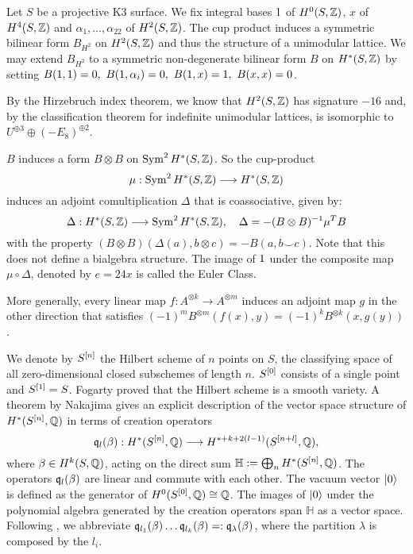 \begin{definition}
Let $S$ be a projective K3 surface. We fix integral bases $1$ of $H^0(S,\mathbb{Z})$, $x$ of $H^4(S,\mathbb{Z})$ and $\alpha_1,\ldots ,\alpha_{22}$ of $H^2(S,\mathbb{Z})$. The cup product induces a symmetric bilinear form $B_{H^2}$ on $H^2(S,\mathbb{Z})$ and thus the structure of a unimodular lattice.
We may extend $B_{H^2}$ to a symmetric non-degenerate bilinear form $B$ on $H^\ast(S,\mathbb{Z})$ by setting $ B(1,1) = 0,\ B(1,\alpha_i) = 0,\ B(1,x) = 1, \ B(x,x) = 0$.
\end{definition}
By the Hirzebruch index theorem, we know that $H^2(S,\mathbb{Z})$ has signature $-16$ and, by the classification theorem for indefinite unimodular lattices, is isomorphic to $U^{\oplus 3}\oplus (-E_8)^{\oplus 2}$.
\begin{definition}\label{comult}
$B$ induces a form $B\otimes B$ on $\operatorname{Sym}^2H^\ast(S,\mathbb{Z})$. So the cup-product 
\begin{equation*}
\mu : \operatorname{Sym} ^2H^{*}(S,\mathbb{Z}) \longrightarrow H^\ast(S,\mathbb{Z}) 
\end{equation*}
induces an adjoint comultiplication $\Delta$ that is coassociative, given by:
\begin{equation*}
\Delta : H^\ast(S,\mathbb{Z}) \longrightarrow \operatorname{Sym}^2H^\ast(S,\mathbb{Z}),\quad \Delta = -(B\otimes B)^{-1}\mu^TB
\end{equation*}
with the property $(B\otimes B)\left(\Delta(a),b\otimes c\right)=-B\left(a,b\smile c\right)$. Note that this does not define a bialgebra structure.
The image of $1$ under the composite map $\mu\circ\Delta$, denoted by $e=24x$ is called the Euler Class.

More generally, every linear map $f: A^{\otimes k} \rightarrow A^{\otimes m}$ induces an adjoint map $g$ in the other direction that satisfies $(-1)^mB^{\otimes m}(f(x),y)= (-1)^{k} B^{\otimes k}(x,g(y))$.
\end{definition}
We denote by $S^{[n]}$ the Hilbert scheme of $n$ points on $S$, \ie the classifying space of all zero-dimensional closed subschemes of length $n$. $S^{[0]}$ consists of a single point and $S^{[1]}=S$. Fogarty \cite[Thm.~2.4]{Fogarty} proved that the Hilbert scheme is a smooth variety.
A theorem by Nakajima \cite{Nakajima} gives an explicit description of the vector space structure of $H^\ast(S^{[n]},\mathbb{Q})$ in terms of creation operators
$$
\mathfrak{q}_l(\beta) :  H^\ast(S^{[n]},\mathbb{Q}) \longrightarrow  H^{\ast+k+2(l-1)}(S^{[n+l]},\mathbb{Q})
,$$ 
where $\beta\in H^k(S,\mathbb{Q})$, acting on the direct sum 
$\mathbb{H}:=\bigoplus_n H^\ast(S^{[n]},\mathbb{Q})$. The operators $\mathfrak{q}_l(\beta)$ are linear and commute with each other. The vacuum vector $|0\rangle$ is defined as the generator of $H^0(S^{[0]},\mathbb{Q})\cong\mathbb{Q}$. The images of $|0\rangle$ under the polynomial algebra generated by the creation operators span $\mathbb{H}$ as a vector space. 
Following \cite{QinWang}, we abbreviate $\mathfrak{q}_{l_1}(\beta)\ldots\mathfrak{q}_{l_k}(\beta)=:\mathfrak{q}_\lambda(\beta)$, where the partition $\lambda$ is composed by the $l_i$. 

